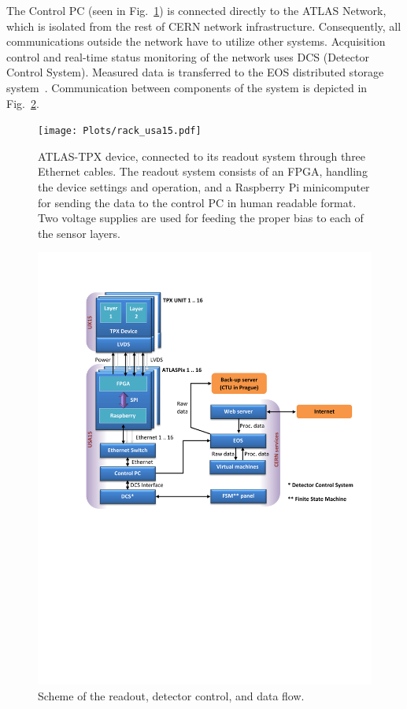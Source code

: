\documentclass[journal]{IEEEtran}
\begin{document}
The Control PC (seen in Fig.~\ref{fig:rack}) is connected directly to the ATLAS Network, which is isolated from the rest of CERN network infrastructure. Consequently, all communications outside the network have to utilize other systems. Acquisition control and real-time status monitoring of the network uses DCS (Detector Control System). Measured data is transferred to the EOS distributed storage system~\cite{MAscetti2015,Peters2011}. Communication between components of the system is depicted in Fig.~\ref{fig:data_flow}.

\begin{figure}[tbp]
	\centering
        \texttt{[image: Plots/rack\_usa15.pdf]}
      \caption {ATLAS-TPX device, connected to its readout system through three Ethernet cables. The readout system consists of an FPGA, handling the device settings and operation, and a Raspberry Pi minicomputer for sending the data to the control PC in human readable format. Two voltage supplies are used for feeding the proper bias to each of the sensor layers.}
    \label{fig:rack}
\end{figure}

\begin{figure}[tbp]
	\centering
        \includegraphics[clip, trim={2cm 11.2cm 0cm 2.6cm}, width=.5\textwidth, angle = 0 ]{Plots/Doc1.pdf}
      \caption {Scheme of the readout, detector control, and data flow.}
    \label{fig:data_flow}
\end{figure}
\end{document}
